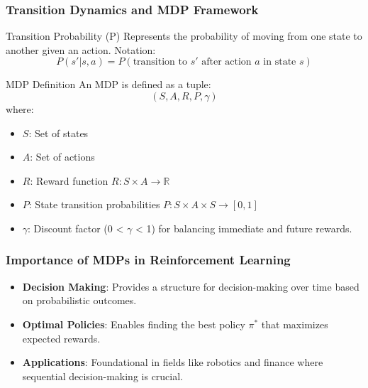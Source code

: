 \documentclass[aspectratio=169]{beamer}
\begin{document}
\begin{frame}[fragile]
    \frametitle{Transition Dynamics and MDP Framework}
    \begin{block}{Transition Probability (P)}
        Represents the probability of moving from one state to another given an action. Notation: 
        \[
        P(s'|s, a) = P(\text{transition to } s' \text{ after action } a \text{ in state } s)
        \]
    \end{block}

    \begin{block}{MDP Definition}
        An MDP is defined as a tuple:
        \[
        (S, A, R, P, \gamma)
        \]
        where:
        \begin{itemize}
            \item \( S \): Set of states
            \item \( A \): Set of actions
            \item \( R \): Reward function \( R: S \times A \rightarrow \mathbb{R} \)
            \item \( P \): State transition probabilities \( P: S \times A \times S \rightarrow [0,1] \)
            \item \( \gamma \): Discount factor (0 < \( \gamma \) < 1) for balancing immediate and future rewards.
        \end{itemize}
    \end{block}
\end{frame}

\begin{frame}[fragile]
    \frametitle{Importance of MDPs in Reinforcement Learning}
    \begin{itemize}
        \item \textbf{Decision Making}: Provides a structure for decision-making over time based on probabilistic outcomes.
        \item \textbf{Optimal Policies}: Enables finding the best policy \( \pi^* \) that maximizes expected rewards.
        \item \textbf{Applications}: Foundational in fields like robotics and finance where sequential decision-making is crucial.
    \end{itemize}
\end{frame}
\end{document}

